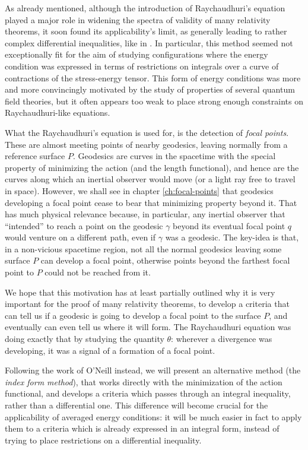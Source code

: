 As already mentioned, although the introduction of Raychaudhuri's equation played a major role in widening the spectra of validity of many relativity theorems, it soon found its applicability's limit, as generally leading to rather complex differential inequalities, like in \cite[]{fewster2011singularity}.
In particular, this method seemed not exceptionally fit for the aim of studying configurations where the energy condition was expressed in terms of restrictions on integrals over a curve of contractions of the stress-energy tensor. This form of energy conditions was more and more convincingly motivated by the study of properties of several quantum field theories, but it often appears too weak to place strong enough constraints on Raychaudhuri-like equations.

What the Raychaudhuri's equation is used for, is the detection of \emph{focal points}. These are almost meeting points of nearby geodesics, leaving normally from a reference surface \(P\). Geodesics are curves in the spacetime with the special property of minimizing the action (and the length functional), and hence are the curves along which an inertial observer would move (or a light ray free to travel in space). However, we shall see in chapter \ref{ch:focal-points} that geodesics developing a focal point cease to bear that minimizing property beyond it. 
That has much physical relevance because, in particular, any inertial observer that ``intended'' to reach a point on the geodesic \(\gamma\) beyond its eventual focal point \(q\) would venture on a different path, even if \(\gamma\) was a geodesic.
The key-idea is that, in a non-vicious spacetime region, not all the normal geodesics leaving some surface \(P\) can develop a focal point, otherwise points beyond the farthest focal point to \(P\) could not be reached from it. 

We hope that this motivation has at least partially outlined why it is very important for the proof of many relativity theorems, to develop a criteria that can tell us if a geodesic is going to develop a focal point to the surface \(P\), and eventually can even tell us where it will form. The Raychaudhuri equation was doing exactly that by studying the quantity \(\theta\): wherever a divergence was developing, it was a signal of a formation of a focal point.

Following the work of O'Neill instead, we will present an alternative method (the \emph{index form method}), that works directly with the minimization of the action functional, and develops a criteria which passes through an integral inequality, rather than a differential one. This difference will become crucial for the applicability of averaged energy conditions: it will be much easier in fact to apply them to a criteria which is already expressed in an integral form, instead of trying to place restrictions on a differential inequality.

